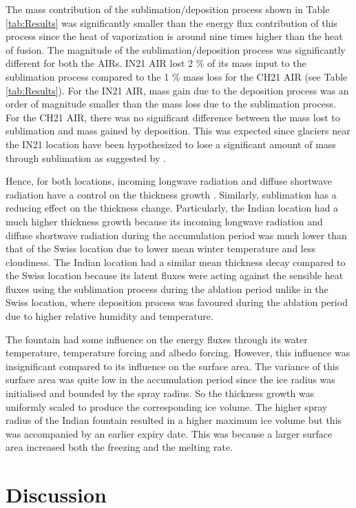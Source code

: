 \documentclass[utf8]{frontiersSCNS}
\begin{document}
The mass contribution of the sublimation/deposition process shown in Table \ref{tab:Results} was significantly
smaller than the energy flux contribution of this process since the heat of vaporization is around nine times
higher than the heat of fusion. The magnitude of the sublimation/deposition process was significantly different
for both the AIRs.  IN21 AIR lost 2 \% of its mass input to the sublimation process compared to the 1 \% mass
loss for the CH21 AIR (see Table \ref{tab:Results}). For the IN21 AIR, mass gain due to the deposition process
was an order of magnitude smaller than the mass loss due to the sublimation process. For the CH21 AIR, there was
no significant difference between the mass lost to sublimation and mass gained by deposition. This was expected
since glaciers near the IN21 location have been hypothesized to lose a significant amount of mass through
sublimation as suggested by \cite{azam_2018}.

Hence, for both locations, incoming longwave radiation and diffuse shortwave radiation have a control on the
thickness growth . Similarly, sublimation has a reducing effect on the thickness change. Particularly, the
Indian location had a much higher thickness growth because its incoming longwave radiation and diffuse shortwave
radiation during the accumulation period was much lower than that of the Swiss location due to lower mean winter
temperature and less cloudiness. The Indian location had a similar mean thickness decay compared to the Swiss
location because its latent fluxes were acting against the sensible heat fluxes using the sublimation process
during the ablation period unlike in the Swiss location, where deposition process was favoured during the
ablation period due to higher relative humidity and temperature.

The fountain had some influence on the energy fluxes through its water temperature, temperature forcing and
albedo forcing. However, this influence was insignificant compared to its influence on the surface area.  The
variance of this surface area was quite low in the accumulation period since the ice radius was initialised and
bounded by the spray radius. So the thickness growth was uniformly scaled to produce the corresponding ice
volume. The higher spray radius of the Indian fountain resulted in a higher maximum ice volume but this was
accompanied by an earlier expiry date. This was because a larger surface area increased both the freezing and
the melting rate.

\section{Discussion}
\end{document}
